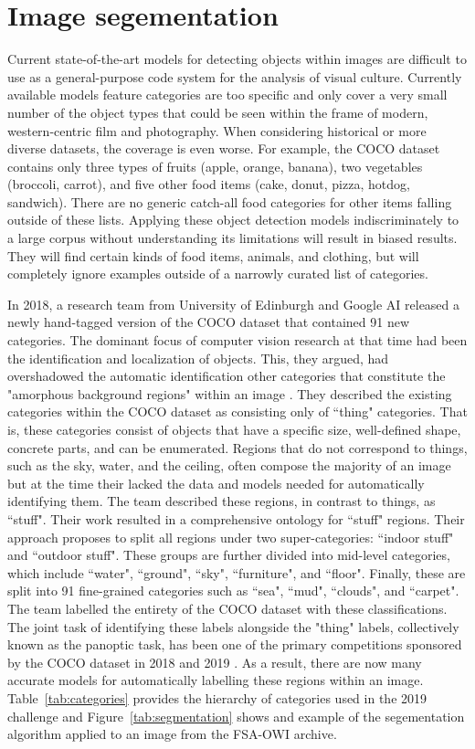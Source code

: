 \documentclass[10pt, a4paper]{article}
\begin{document}
\section{Image segementation} \label{sec:imageseg}

Current state-of-the-art models for detecting objects within images are difficult
to use as a general-purpose code system for the analysis of visual culture.
Currently available models feature categories are too specific and only cover
a very small number of the object types that could be seen within the frame
of modern, western-centric film and photography. When considering historical
or more diverse datasets, the coverage is even worse. For example, the COCO
dataset contains only three types of fruits (apple, orange, banana), two
vegetables (broccoli, carrot), and five other food items (cake, donut, pizza,
hotdog, sandwich). There are no generic catch-all food categories for other
items falling outside of these lists. Applying these object detection models
indiscriminately to a large corpus without understanding its limitations will
result in biased results. They will find certain kinds of food items, animals,
and clothing, but will completely ignore examples outside of a narrowly curated
list of categories.

In 2018, a research team from University of Edinburgh and Google AI released a
newly hand-tagged version of the COCO dataset that contained 91 new categories.
The dominant focus of computer vision research at that time had been the
identification and localization of objects. This, they argued, had overshadowed
the automatic identification other categories that constitute the "amorphous
background regions" within an image \cite{caesar2018coco}. They described the
existing categories
within the COCO dataset as consisting only of ``thing" categories. That is,
these categories consist of objects that have a specific size, well-defined
shape, concrete parts, and can be enumerated. Regions that do not correspond to
things, such as the sky, water, and the ceiling, often compose the majority of
an image but at the time their lacked the data and models needed for
automatically identifying them. The team described these regions, in contrast
to things, as ``stuff". Their work resulted in a comprehensive ontology for
``stuff" regions. Their approach proposes to split all regions under two
super-categories: ``indoor stuff" and ``outdoor stuff". These groups are further
divided into mid-level categories, which include ``water", ``ground", ``sky",
``furniture", and ``floor". Finally, these are split into 91 fine-grained
categories such as ``sea", ``mud", ``clouds", and ``carpet". The team labelled
the entirety of the COCO dataset with these classifications. The joint task of
identifying these labels alongside the "thing" labels, collectively known as
the panoptic task, has been one of the primary competitions sponsored by the
COCO dataset in 2018 and 2019 \cite{kirillov2019panoptic}.
As a result, there are now many accurate models for automatically labelling
these regions within an image. Table~\ref{tab:categories}
provides the hierarchy of categories used in the 2019 challenge and
Figure~\ref{tab:segmentation} shows and example of the segementation algorithm
applied to an image from the FSA-OWI archive.
\end{document}
